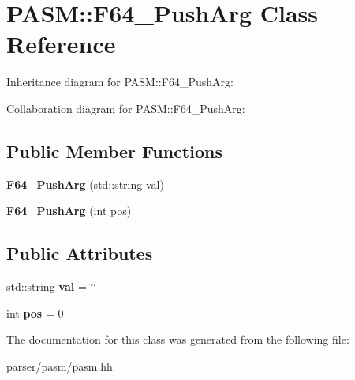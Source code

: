 \hypertarget{classPASM_1_1F64__PushArg}{}\section{P\+A\+SM\+:\+:F64\+\_\+\+Push\+Arg Class Reference}
\label{classPASM_1_1F64__PushArg}


Inheritance diagram for P\+A\+SM\+:\+:F64\+\_\+\+Push\+Arg\+:


Collaboration diagram for P\+A\+SM\+:\+:F64\+\_\+\+Push\+Arg\+:
\subsection*{Public Member Functions}
\begin{DoxyCompactItemize}
\item 
\mbox{\label{classPASM_1_1F64__PushArg_acf2e0e9a21aa25fb8f4fe3e757670eb4}} 
{\bfseries F64\+\_\+\+Push\+Arg} (std\+::string val)
\item 
\mbox{\label{classPASM_1_1F64__PushArg_a7b7062450553189704e1270b58319a0b}} 
{\bfseries F64\+\_\+\+Push\+Arg} (int pos)
\end{DoxyCompactItemize}
\subsection*{Public Attributes}
\begin{DoxyCompactItemize}
\item 
\mbox{\label{classPASM_1_1F64__PushArg_ac88c9f08b87604a2a51ced8e9782deae}} 
std\+::string {\bfseries val} = \char`\"{}\char`\"{}
\item 
\mbox{\label{classPASM_1_1F64__PushArg_a9115eb76576b5620946812e1dc6e25e1}} 
int {\bfseries pos} = 0
\end{DoxyCompactItemize}


The documentation for this class was generated from the following file\+:\begin{DoxyCompactItemize}
\item 
parser/pasm/pasm.\+hh\end{DoxyCompactItemize}
